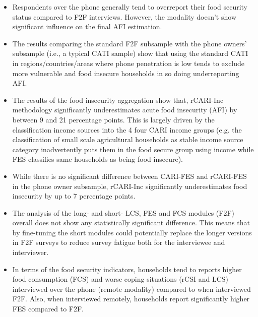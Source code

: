 \documentclass[11pt,harvard]{article}
\begin{document}
	\begin{itemize}[left=2.5em]
		\item Respondents over the phone generally tend to overreport their food security status compared to F2F interviews. However, the modality doesn’t show significant influence on the final AFI estimation.
		\item The results comparing the standard F2F subsample with the phone owners’ subsample (i.e., a typical CATI sample) show that using the standard CATI in regions/countries/areas where phone penetration is low tends to exclude more vulnerable and food insecure households in so doing underreporting AFI.
		\item The results of the food insecurity aggregation show that, rCARI-Inc methodology significantly underestimates acute food insecurity (AFI) by between 9 and 21 percentage points. This is largely driven by the classification  income sources into the 4 four CARI income groups (e.g. the classification of small scale agricultural households as stable income source category inadvertently puts them in the food secure group  using income while FES classifies same households as being food insecure).
		\item While there is no significant difference between CARI-FES and rCARI-FES in the phone owner subsample, rCARI-Inc significantly underestimates food insecurity by up to 7 percentage points.
		\item The analysis of the long- and short- LCS, FES and FCS modules (F2F) overall does not show any statistically significant difference. This means that by fine-tuning the short modules could potentially replace the longer versions in F2F surveys to reduce survey fatigue both for the interviewee and interviewer.
		\item In terms of the food security indicators,  households tend to  reports higher food consumption (FCS) and worse coping situations (rCSI and LCS)  interviewed over the phone (remote modality) compared to when interviewed F2F. Also, when interviewed remotely, households report significantly higher FES compared to F2F. 
	
	
	\end{itemize}
	
	
\pagebreak
	
	
\end{document}
